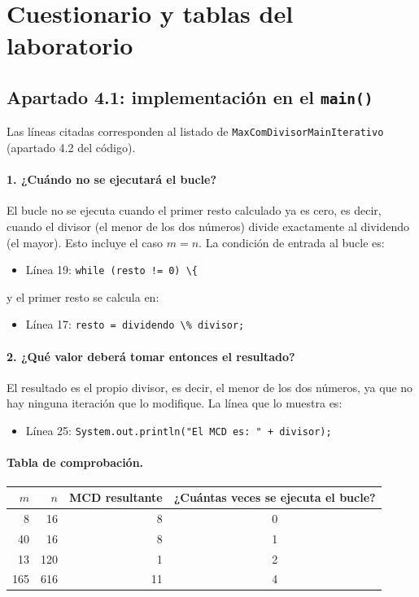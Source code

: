 \documentclass[11pt,a4paper]{article}
\newcommand{\cod}[1]{\lstinline[basicstyle=\ttfamily\footnotesize]|#1|}
\begin{document}
\newpage
\section{Cuestionario y tablas del laboratorio}

\subsection{Apartado 4.1: implementación en el \texttt{main()}}
Las líneas citadas corresponden al listado de \texttt{MaxComDivisorMainIterativo} (apartado 4.2 del código).

\paragraph{1. ¿Cuándo \textbf{no} se ejecutará el bucle?}
El bucle no se ejecuta cuando el primer resto calculado ya es cero, es decir, cuando el divisor (el menor de los dos números) divide exactamente al dividendo (el mayor). Esto incluye el caso $m=n$. La condición de entrada al bucle es:
\begin{itemize}
  \item Línea 19: \cod{while (resto != 0) \{}
\end{itemize}
y el primer resto se calcula en:
\begin{itemize}
  \item Línea 17: \cod{resto = dividendo \% divisor;}
\end{itemize}

\paragraph{2. ¿Qué valor deberá tomar entonces el resultado?}
El resultado es el propio divisor, es decir, el menor de los dos números, ya que no hay ninguna iteración que lo modifique. La línea que lo muestra es:
\begin{itemize}
  \item Línea 25: \cod{System.out.println("El MCD es: " + divisor);}
\end{itemize}

\paragraph{Tabla de comprobación.}
\begin{center}
\begin{tabular}{rrrc}
\toprule
$m$ & $n$ & MCD resultante & ¿Cuántas veces se ejecuta el bucle? \\
\midrule
8   & 16  & 8  & 0 \\
40  & 16  & 8  & 1 \\
13  & 120 & 1  & 2 \\
165 & 616 & 11 & 4 \\
\bottomrule
\end{tabular}
\end{center}
\end{document}
